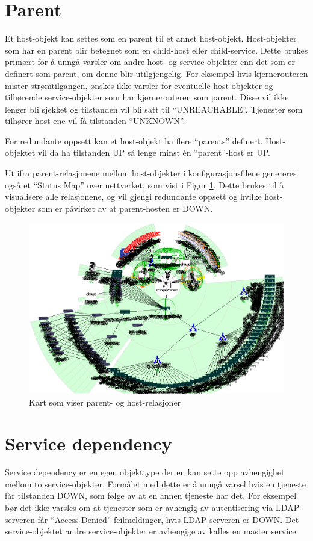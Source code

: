 \section{Parent}\label{sec:parent}
Et host-objekt kan settes som en parent til et annet host-objekt. Host-objekter som har en parent blir betegnet som en child-host eller child-service. Dette brukes primært for å unngå varsler om andre host- og service-objekter enn det som er definert som parent, om denne blir utilgjengelig. For eksempel hvis kjernerouteren mister strømtilgangen, ønskes ikke varsler for eventuelle host-objekter og tilhørende service-objekter som har kjernerouteren som parent. Disse vil ikke lenger bli sjekket og tilstanden vil bli satt til ``UNREACHABLE''. Tjenester som tilhører host-ene vil få tilstanden ``UNKNOWN''.

For redundante oppsett kan et host-objekt ha flere ``parents'' definert. Host-objektet vil da ha tilstanden UP så lenge minst én ``parent''-host er UP.

Ut ifra parent-relasjonene mellom host-objekter i konfigurasjonsfilene genereres også et ``Status Map'' over nettverket, som vist i Figur \ref{statusmap}. Dette brukes til å visualisere alle relasjonene, og vil gjengi redundante oppsett og hvilke host-objekter som er påvirket av at parent-hosten er DOWN.

\begin{figure}[H]
    \centering
    \includegraphics[scale=0.6]{img/statusmap}
    \caption{Kart som viser parent- og host-relasjoner}
    \label{statusmap}
\end{figure}

\section{Service dependency}\label{sec:servicedependency}
Service dependency er en egen objekttype der en kan sette opp avhengighet mellom to service-objekter. Formålet med dette er å unngå varsel hvis en tjeneste får tilstanden DOWN, som følge av at en annen tjeneste har det. For eksempel bør det ikke varsles om at tjenester som er avhengig av autentisering via LDAP-serveren får ``Access Denied''-feilmeldinger, hvis LDAP-serveren er DOWN. Det service-objektet andre service-objekter er avhengige av kalles en master service. 

